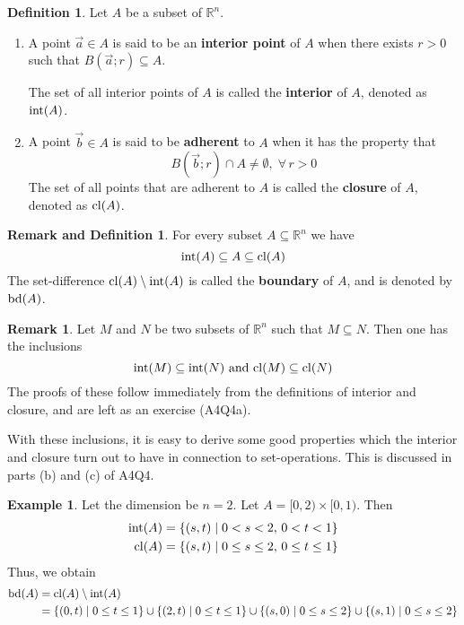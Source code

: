\documentclass[11pt]{article}
\theoremstyle{definition}
\newtheorem{defn}[thm]{Definition}
\newtheorem{exmp}[thm]{Example}
\newtheorem{remark}[thm]{Remark}
\newtheorem{remdefn}[thm]{Remark and Definition}
\newcommand{\R}{\ensuremath{\mathbb{R}}}
\begin{document}
\begin{defn}
Let $A$ be a subset of $\R^n$. \vspace{-1.5ex}
\begin{enumerate}[(1)]
    \item A point $\vec{a} \in A$ is said to be an {\bf interior point} of $A$ when there exists $r > 0$ such that $B(\vec{a}; r) \subseteq A$.
    
    The set of all interior points of $A$ is called the {\bf interior} of $A$, denoted as ${\rm int}(A)$.
    
    \item A point $\vec{b} \in A$ is said to be {\bf adherent} to $A$ when it has the property that
    $$B(\vec{b}; r) \cap A \neq \emptyset,\; \forall\,r > 0$$
    The set of all points that are adherent to $A$ is called the {\bf closure} of $A$, denoted as ${\rm cl}(A)$. 
\end{enumerate}
\end{defn}

\begin{remdefn}
For every subset $A \subseteq \R^n$ we have
$${\rm int}(A) \subseteq A \subseteq {\rm cl}(A)$$
The set-difference ${\rm cl}(A) \setminus {\rm int}(A)$ is called the {\bf boundary} of $A$, and is denoted by ${\rm bd}(A)$. 
\end{remdefn}

\begin{remark}
Let $M$ and $N$ be two subsets of $\R^n$ such that $M \subseteq N$. Then one has the inclusions
$${\rm int}(M) \subseteq {\rm int}(N) \text{ and } {\rm cl}(M) \subseteq {\rm cl}(N)$$
The proofs of these follow immediately from the definitions of interior and closure, and are left as an exercise (A4Q4a). 

With these inclusions, it is easy to derive some good properties which the interior and closure turn out to have in connection to set-operations. This is discussed in parts (b) and (c) of A4Q4.
\end{remark}

\begin{exmp}
Let the dimension be $n = 2$. Let $A = [0, 2) \times [0, 1)$. Then
\begin{align*}
    {\rm int}(A) &= \{(s, t) \mid 0 < s < 2,\, 0 < t < 1\} \\
    {\rm cl}(A) &= \{(s, t) \mid 0 \leq s \leq 2,\, 0 \leq t \leq 1\} 
\end{align*}
Thus, we obtain
\begin{align*}
    {\rm bd}(A) &= {\rm cl}(A) \setminus {\rm int}(A) \\
    &= \{(0, t) \mid 0 \leq t \leq 1\} \cup \{(2, t) \mid 0 \leq t \leq 1\} \cup \{(s, 0) \mid 0 \leq s \leq 2\} \cup \{(s, 1) \mid 0 \leq s \leq 2\}
\end{align*}
\end{exmp}
\end{document}
